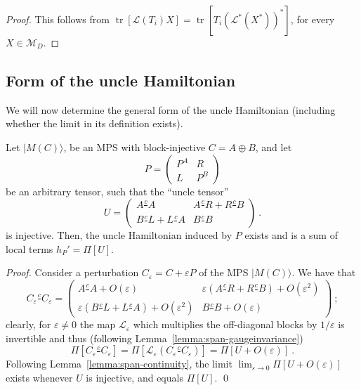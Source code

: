 \documentclass[cmp]{svjour}
\newcommand{\mc}[1]{\mathcal{#1}}
\newcommand{\veps}{\varepsilon}
\newcommand{\ket}[1]{|#1\rangle}
\def\cont{\tfrac{c}{\ \ }}
\DeclareMathOperator{\trace}{tr} \DeclareMathOperator{\GL}{gl}
\begin{document}
\begin{proof}
    This follows from $\trace[\mc L(T_i)X]=\trace[T_i(\mc L^*(X^*))^*]$, for every $X\in \mc M_D$.
\end{proof}





\subsection{Form of the uncle Hamiltonian}

We will now determine the general form of the uncle Hamiltonian
(including whether the limit in its definition exists).

\begin{theorem}\label{thm:unclehamiltonian}
    Let $\ket{M(C)}$, be an MPS with block-injective $C=A\oplus B$,
    and let
    \[
        P=\left( \begin{array}{cc}
                P^A & R   \\
                L   & P^B
            \end{array} \right)
    \]
    be an arbitrary tensor, such that the ``uncle tensor''
    \begin{equation}
        \label{eq:uncletensor-2site}
        U=\left( \begin{array}{cc}
                A\cont A          & A \cont  R+R\cont B \\
                B\cont L+L\cont A & B\cont B
            \end{array} \right)\ .
    \end{equation}
    is injective.  Then, the uncle Hamiltonian induced by $P$ exists and is a
    sum of local terms $h_P' = \Pi[U]$.
\end{theorem}


\begin{proof}
    Consider a perturbation $C_\varepsilon = C + \varepsilon P$ of the MPS
    $\ket{M(C)}$.  We have that
    \begin{equation}
        C_\varepsilon \cont C_\varepsilon=
        \left( \begin{array}{cc}
            A\cont A + O(\varepsilon)                          &
            \varepsilon (A\cont R+R\cont B) + O(\varepsilon ^2)  \\
            \varepsilon(B\cont L+L\cont A) + O(\varepsilon ^2) &
            B\cont B + O(\varepsilon)
        \end{array} \right)\ ;
    \end{equation}
    clearly, for $\veps\ne0$ the map $\mc L_\veps$ which multiplies the
    off-diagonal blocks by $1/\veps$ is invertible and thus (following
    Lemma~\ref{lemma:span-gaugeinvariance})
    \[
        \Pi[C_\veps\cont C_\veps] =
        \Pi[\mc L_\veps(C_\veps\cont C_\veps)]
        =\Pi[U+O(\veps)]\ .
    \]
    Following Lemma~\ref{lemma:span-continuity}, the limit $\lim_{\varepsilon \to 0}
        \Pi[U+O(\veps)]$ exists whenever $U$ is injective, and equals $\Pi[U]$.
    \hspace*{\fill}\qed
\end{proof}
\end{document}
